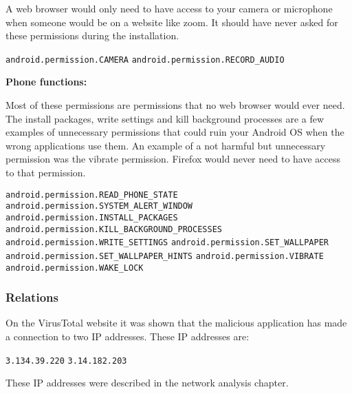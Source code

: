 A web browser would only need to have access to your camera or microphone when someone would be on a website like zoom.
It should have never asked for these permissions during the installation. 

\texttt{android.permission.CAMERA}
\newline \texttt{android.permission.RECORD\_AUDIO}

\newpage
\textbf{Phone functions:}

Most of these permissions are permissions that no web browser would ever need.
The install packages, write settings and kill background processes are a few examples of unnecessary permissions that could ruin your Android OS when the wrong applications use them.
An example of a not harmful but unnecessary permission was the vibrate permission.
Firefox would never need to have access to that permission.

\texttt{android.permission.READ\_PHONE\_STATE}
\newline \texttt{android.permission.SYSTEM\_ALERT\_WINDOW}
\newline \texttt{android.permission.INSTALL\_PACKAGES}
\newline \texttt{android.permission.KILL\_BACKGROUND\_PROCESSES}
\newline \texttt{android.permission.WRITE\_SETTINGS}
\newline \texttt{android.permission.SET\_WALLPAPER}
\newline \texttt{android.permission.SET\_WALLPAPER\_HINTS}
\newline \texttt{android.permission.VIBRATE}
\newline \texttt{android.permission.WAKE\_LOCK}

\subsubsection{Relations}
On the VirusTotal website it was shown that the malicious application has made a connection to two IP addresses.
These IP addresses are:

\texttt{3.134.39.220}
\newline \texttt{3.14.182.203}

These IP addresses were described in the network analysis chapter.